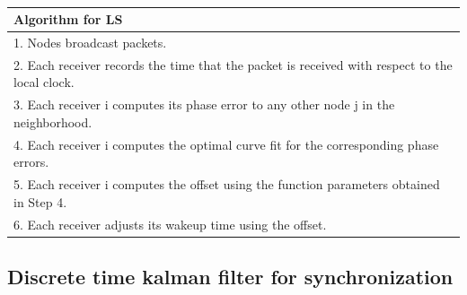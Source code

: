 \documentclass[a4paper,10pt]{report}
\begin{document}
\paragraph*{}
\begin{tabular}{  l }Algorithm for LS \\\hline \hline
1. Nodes broadcast packets. \\  2. Each receiver records the time that the packet is received with respect to the local clock. \\
3. Each receiver i computes its phase error to any other node j in the neighborhood. \\
4. Each receiver i computes the optimal curve fit for the corresponding phase errors. \\
5. Each receiver i computes the offset using the function parameters obtained in Step 4. \\
6. Each receiver adjusts its wakeup time using the offset.\\
\hline \hline
\end{tabular}
\subsection{\textbf{Discrete time kalman filter for synchronization}}
\end{document}
